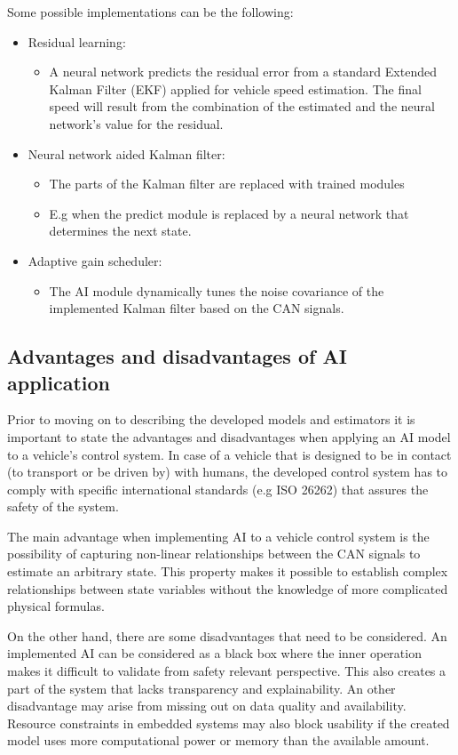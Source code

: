 Some possible implementations can be the following:
\begin{itemize}
    \item Residual learning:
    \begin{itemize}
        \item A neural network predicts the residual error from a standard Extended Kalman Filter (EKF) applied for vehicle speed estimation. The final speed will result from the combination of the estimated and the neural network's value for the residual. 
    \end{itemize}
    \item Neural network aided Kalman filter:
    \begin{itemize}
        \item The parts of the Kalman filter are replaced with trained modules
        \item E.g when the predict module is replaced by a neural network that determines the next state. 
    \end{itemize}
    \item Adaptive gain scheduler:
    \begin{itemize}
        \item The AI module dynamically tunes the noise covariance of the implemented Kalman filter based on the CAN signals. 
    \end{itemize}
\end{itemize}

\subsection{Advantages and disadvantages of AI application}

Prior to moving on to describing the developed models and estimators it is important to state the advantages and disadvantages when applying an AI model to a vehicle's control system. In case of a vehicle that is designed to be in contact (to transport or be driven by) with humans, the developed control system has to comply with specific international standards (e.g ISO 26262) that assures the safety of the system.

The main advantage when implementing AI to a vehicle control system is the possibility of capturing non-linear relationships between the CAN signals to estimate an arbitrary state. This property makes it possible to establish complex relationships between state variables without the knowledge of more complicated physical formulas. 

On the other hand, there are some disadvantages that need to be considered. An implemented AI can be considered as a black box where the inner operation makes it difficult to validate from safety relevant perspective. This also creates a part of the system that lacks transparency and explainability. An other disadvantage may arise from missing out on data quality and availability. Resource constraints in embedded systems may also block usability if the created model uses more computational power or memory than the available amount. 